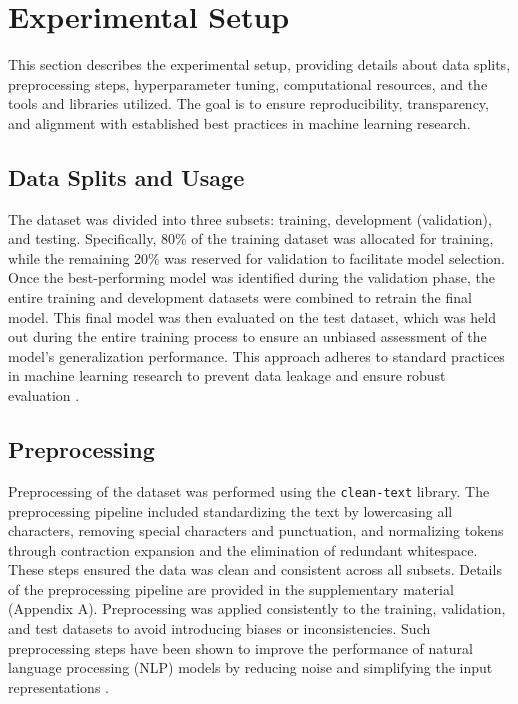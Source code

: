 \section{Experimental Setup}

This section describes the experimental setup, providing details about data splits, preprocessing steps, hyperparameter tuning, computational resources, and the tools and libraries utilized. The goal is to ensure reproducibility, transparency, and alignment with established best practices in machine learning research.


\subsection{Data Splits and Usage}
The dataset\cite{muhammad2025brighterbridginggaphumanannotated} was divided into three subsets: training, development (validation), and testing. Specifically, 80\% of the training dataset was allocated for training, while the remaining 20\% was reserved for validation to facilitate model selection. Once the best-performing model was identified during the validation phase, the entire training and development datasets were combined to retrain the final model. This final model was then evaluated on the test dataset, which was held out during the entire training process to ensure an unbiased assessment of the model's generalization performance. This approach adheres to standard practices in machine learning research to prevent data leakage and ensure robust evaluation \citep{Goodfellow-et-al-2016}.

\subsection{Preprocessing}

Preprocessing of the dataset was performed using the \texttt{clean-text} library. The preprocessing pipeline included standardizing the text by lowercasing all characters, removing special characters and punctuation, and normalizing tokens through contraction expansion and the elimination of redundant whitespace. These steps ensured the data was clean and consistent across all subsets. Details of the preprocessing pipeline are provided in the supplementary material (Appendix A). Preprocessing was applied consistently to the training, validation, and test datasets to avoid introducing biases or inconsistencies. Such preprocessing steps have been shown to improve the performance of natural language processing (NLP) models by reducing noise and simplifying the input representations \citep{Zhang2020DataPrep}.

